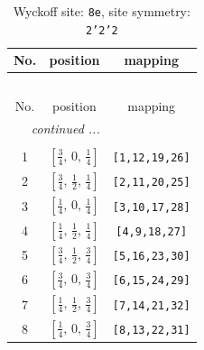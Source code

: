 \documentclass[fleqn,8pt]{jsarticle}
\begin{document}
\begin{longtable}{ccc}
\caption{Wyckoff site: {\tt 8e}, site symmetry: {\tt 2'2'2}}
 \\
 \hline \hline
No. & position & mapping \\ \hline \endfirsthead

\multicolumn{2}{l}{\tablename\ \thetable{}} \\
 \hline \hline
No. & position & mapping \\ \hline \endhead

 \hline \hline
\multicolumn{2}{r}{\footnotesize\it continued ...} \\ \endfoot

 \hline \hline
\multicolumn{2}{r}{} \\ \endlastfoot

1 & $\left[ \frac{3}{4},\, 0,\, \frac{1}{4} \right]$ & {\tt [1,12,19,26]} \\ \hline
2 & $\left[ \frac{3}{4},\, \frac{1}{2},\, \frac{1}{4} \right]$ & {\tt [2,11,20,25]} \\ \hline
3 & $\left[ \frac{1}{4},\, 0,\, \frac{1}{4} \right]$ & {\tt [3,10,17,28]} \\ \hline
4 & $\left[ \frac{1}{4},\, \frac{1}{2},\, \frac{1}{4} \right]$ & {\tt [4,9,18,27]} \\ \hline
5 & $\left[ \frac{3}{4},\, \frac{1}{2},\, \frac{3}{4} \right]$ & {\tt [5,16,23,30]} \\ \hline
6 & $\left[ \frac{3}{4},\, 0,\, \frac{3}{4} \right]$ & {\tt [6,15,24,29]} \\ \hline
7 & $\left[ \frac{1}{4},\, \frac{1}{2},\, \frac{3}{4} \right]$ & {\tt [7,14,21,32]} \\ \hline
8 & $\left[ \frac{1}{4},\, 0,\, \frac{3}{4} \right]$ & {\tt [8,13,22,31]} \\
\end{longtable}
\renewcommand{\arraystretch}{1.2}
\end{document}
